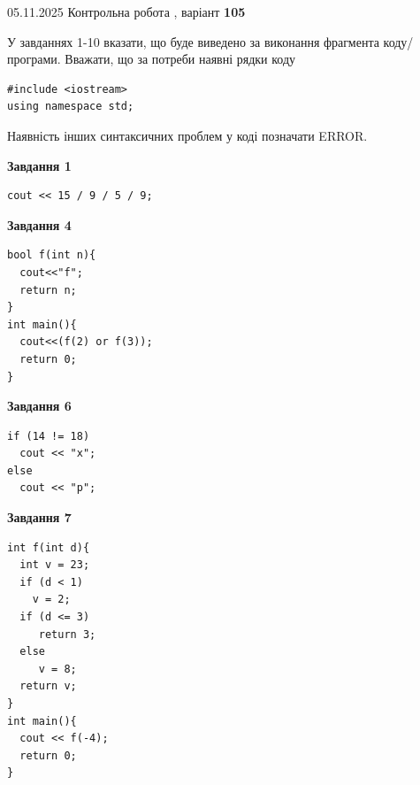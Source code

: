 \documentclass[12pt, ukrainian]{article}
\begin{document}
\newpage

{\Large{05.11.2025 Контрольна робота , варіант  \No \textbf { 105 }\par}}
{
\begin {large}
У завданнях 1-10 вказати, що буде виведено за виконання фрагмента коду/про\-гра\-ми.
Вважати, що за потреби наявні рядки коду
\begin{verbatim}
#include <iostream>
using namespace std;
\end{verbatim}
Наявність інших синтаксичних проблем у коді позначати ERROR.

\begin{minipage}[t]{7.0cm}

\begin{center}
\textbf{Завдання 1}
\end{center}
\vspace{-8mm}

\begin{verbatim}
cout << 15 / 9 / 5 / 9;
\end{verbatim}



\begin{center}
\textbf{Завдання 4}
\end{center}
\vspace{-8mm}

\begin{verbatim}
bool f(int n){
  cout<<"f";
  return n;
}
int main(){
  cout<<(f(2) or f(3));
  return 0;
}
\end{verbatim}



\begin{center}
\textbf{Завдання 6}
\end{center}
\vspace{-8mm}

\begin{verbatim}
if (14 != 18)
  cout << "x";
else
  cout << "p";
\end{verbatim}



\begin{center}
\textbf{Завдання 7}
\end{center}
\vspace{-8mm}

\begin{verbatim}
int f(int d){
  int v = 23;
  if (d < 1)
    v = 2;
  if (d <= 3)
     return 3;
  else
     v = 8;
  return v;
}
int main(){
  cout << f(-4);
  return 0;
}
\end{verbatim}


\end{minipage}
\end{large}}
\end{document}
